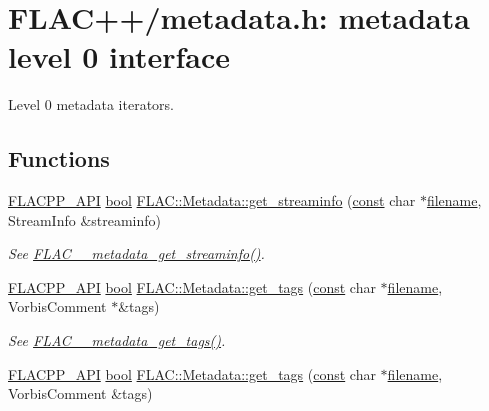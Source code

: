 \hypertarget{group__flacpp__metadata__level0}{}\section{F\+L\+A\+C++/metadata.h\+: metadata level 0 interface}
\label{group__flacpp__metadata__level0}


Level 0 metadata iterators.  


\subsection*{Functions}
\begin{DoxyCompactItemize}
\item 
\hyperlink{group__flacpp__export_gaec3a801bf18630403eda6dc2f8c4927a}{F\+L\+A\+C\+P\+P\+\_\+\+A\+PI} \hyperlink{mac_2config_2i386_2lib-src_2libsoxr_2soxr-config_8h_abb452686968e48b67397da5f97445f5b}{bool} \hyperlink{group__flacpp__metadata__level0_ga7dd10e98bdacabcff282c5bf3b29a34a}{F\+L\+A\+C\+::\+Metadata\+::get\+\_\+streaminfo} (\hyperlink{getopt1_8c_a2c212835823e3c54a8ab6d95c652660e}{const} char $\ast$\hyperlink{test__portburn_8cpp_a7efa5e9c7494c7d4586359300221aa5d}{filename}, Stream\+Info \&streaminfo)
\begin{DoxyCompactList}\small\item\em See \hyperlink{group__flac__metadata__level0_gaf248d1ccc8025b9e9d7f532b8af4ab07}{F\+L\+A\+C\+\_\+\+\_\+metadata\+\_\+get\+\_\+streaminfo()}. \end{DoxyCompactList}\item 
\hyperlink{group__flacpp__export_gaec3a801bf18630403eda6dc2f8c4927a}{F\+L\+A\+C\+P\+P\+\_\+\+A\+PI} \hyperlink{mac_2config_2i386_2lib-src_2libsoxr_2soxr-config_8h_abb452686968e48b67397da5f97445f5b}{bool} \hyperlink{group__flacpp__metadata__level0_gab9595fd6d76d734eb4010f5740f2509e}{F\+L\+A\+C\+::\+Metadata\+::get\+\_\+tags} (\hyperlink{getopt1_8c_a2c212835823e3c54a8ab6d95c652660e}{const} char $\ast$\hyperlink{test__portburn_8cpp_a7efa5e9c7494c7d4586359300221aa5d}{filename}, Vorbis\+Comment $\ast$\&tags)
\begin{DoxyCompactList}\small\item\em See \hyperlink{group__flac__metadata__level0_gaf66469f31dca28837ffd3f8b0ec5c082}{F\+L\+A\+C\+\_\+\+\_\+metadata\+\_\+get\+\_\+tags()}. \end{DoxyCompactList}\item 
\hyperlink{group__flacpp__export_gaec3a801bf18630403eda6dc2f8c4927a}{F\+L\+A\+C\+P\+P\+\_\+\+A\+PI} \hyperlink{mac_2config_2i386_2lib-src_2libsoxr_2soxr-config_8h_abb452686968e48b67397da5f97445f5b}{bool} \hyperlink{group__flacpp__metadata__level0_gaae3e5fdfa4f866239d665c5b5cef6fe0}{F\+L\+A\+C\+::\+Metadata\+::get\+\_\+tags} (\hyperlink{getopt1_8c_a2c212835823e3c54a8ab6d95c652660e}{const} char $\ast$\hyperlink{test__portburn_8cpp_a7efa5e9c7494c7d4586359300221aa5d}{filename}, Vorbis\+Comment \&tags)

\end{DoxyCompactItemize}
